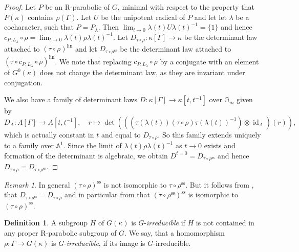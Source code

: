 \documentclass{amsart}
\theoremstyle{definition}
\newtheorem{defi}[prop]{Definition}
\theoremstyle{remark}
\newtheorem{remar}[prop]{Remark}
\DeclareMathOperator{\id}{id}
\newcommand{\semi}{\mathrm{ss}}
\newcommand{\Gm}{\mathbb G_{m}}
\newcommand{\lin}{\mathrm{lin}}
\begin{document}
\begin{proof} Let $P$ be an R-parabolic of $G$, minimal with respect to the property that 
$P(\kappa)$ contains $\rho(\Gamma)$. Let $U$ be the unipotent radical of $P$ and let 
let $\lambda$ be a cocharacter, such that $P=P_{\lambda}$.
Then $\lim\nolimits_{t \to 0} \lambda(t) U\lambda(t)^{-1}=\{1\}$ and hence
$c_{P, L_{\lambda}}\circ \rho= \lim\nolimits_{t \to 0} \lambda(t) \rho \lambda(t)^{-1}$. 
Let $D_{\tau \circ \rho} : \kappa[\Gamma] \to \kappa$ be the determinant law attached to $(\tau \circ \rho)^{\lin}$ and let $D_{\tau\circ\rho^{\semi}}$ be the determinant law attached to $(\tau \circ c_{P, L_{\lambda}}\circ \rho)^{\lin}$. We note that replacing $c_{P, L_{\lambda}}\circ \rho$ by a conjugate 
with an element of $G^0(\kappa)$ does not change the determinant law, as they are invariant under conjugation.

We also have a family of determinant laws $D : \kappa[\Gamma] \to \kappa[t,t^{-1}]$ over $\Gm$ given by $$D_A : A[\Gamma] \to A[t,t^{-1}], \quad r \mapsto \det(((\tau(\lambda(t)) (\tau \circ \rho) \tau(\lambda(t))^{-1}) \otimes \id_A)(r)),$$ which is actually constant in $t$ and equal to $D_{\tau \circ \rho}$. So this family extends uniquely to a family over $\mathbb A^1$. Since the limit of $\lambda(t) \rho \lambda(t)^{-1}$ as $t \to 0$ exists and formation of the determinant is algebraic, we obtain $D^{t=0} = D_{\tau \circ \rho^{\semi}}$ and hence $D_{\tau \circ \rho} = D_{\tau \circ \rho^{\semi}}$.
\end{proof}

\begin{remar} In general $(\tau \circ \rho)^{\semi}$ is not isomorphic to $\tau \circ \rho^{\semi}$. But it follows from , that $D_{\tau \circ \rho^{\semi}} = D_{\tau \circ \rho}$ and in particular from \cite[Theorem 2.12]{che_durham} that $(\tau \circ \rho^{\semi})^{\semi}$ is isomorphic to $(\tau \circ \rho)^{\semi}$.
\end{remar}

\begin{defi}\label{defi_G_irr} A subgroup $H$ of $G(\kappa)$ is $G$-\emph{irreducible}  if 
$H$ is not contained in any proper R-parabolic subgroup of $G$. 
 We say, that a homomorphism $\rho:\Gamma \rightarrow G(\kappa)$ is $G$-\emph{irreducible}, if its image is 
 $G$-irreducible.
 \end{defi} 
\end{document}
